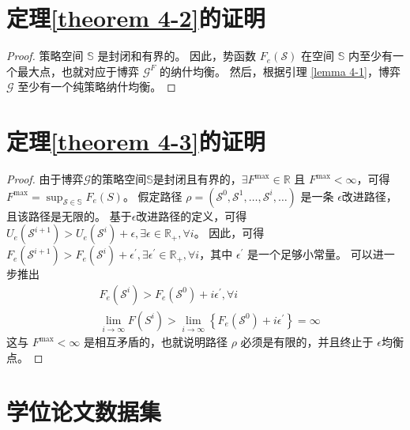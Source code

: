 \section{定理\ref{theorem 4-2}的证明}
\label{appendix h}
\begin{proof}
策略空间 $\mathbb{S}$ 是封闭和有界的。 
因此，势函数 $F_{e}(\mathcal{S})$ 在空间 $\mathbb{S}$ 内至少有一个最大点，也就对应于博弈 $\mathcal{G}^{F}$ 的纳什均衡。 
然后，根据引理 \ref{lemma 4-1}，博弈 $\mathcal{G}$ 至少有一个纯策略纳什均衡。
\end{proof}

\section{定理\ref{theorem 4-3}的证明}
\label{appendix i}
\begin{proof}
由于博弈$\mathcal{G}$的策略空间$\mathbb{S}$是封闭且有界的，$\exists F^{\max} \in \mathbb{R}$ 且 $F^{\max} < \infty$，可得$F^{\max} = \sup _{\mathcal{S} \in \mathbb{S}} F_{e}(S)$。
假定路径 $\rho=\left(\mathcal{S}^{0}, \mathcal{S}^{1}, \ldots, \mathcal{S}^{i}, \ldots\right)$ 是一条 $\epsilon$改进路径，且该路径是无限的。
基于$\epsilon$改进路径的定义，可得$U_{e}\left(\mathcal{S}^{i+1}\right) > U_{e}\left(\mathcal{S}^{i}\right) + \epsilon, \exists \epsilon \in \mathbb{R}_{+}, \forall i$。
因此，可得$F_{e}\left(\mathcal{S}^{i+1}\right) > F_{e}\left(\mathcal{S}^{i}\right) + \epsilon^{\prime}, \exists \epsilon^{\prime} \in \mathbb{R}_{+}, \forall i$，其中 $\epsilon^{\prime}$ 是一个足够小常量。
可以进一步推出
\begin{align}
	&F_{e}\left(\mathcal{S}^{i}\right) > F_{e}\left(\mathcal{S}^{0}\right) + i   \epsilon^{\prime}, \forall i \\
	&\lim _{i \rightarrow \infty} F\left(S^{i}\right) > \lim _{i \rightarrow \infty} \left \{ F_{e}\left(\mathcal{S}^{0}\right) + i   \epsilon^{\prime} \right\} =\infty
\end{align}
这与 $F^{\max} < \infty$ 是相互矛盾的，也就说明路径 $\rho$ 必须是有限的，并且终止于 $\epsilon$均衡点。
\end{proof}

\section{学位论文数据集}

